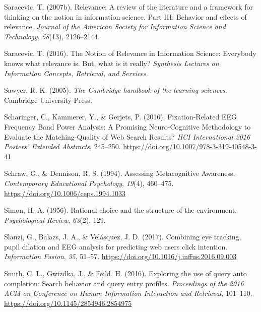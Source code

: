 \documentclass[letterpaper, nobind]{templates/ociamthesis}
\newlength{\cslhangindent}
\newenvironment{CSLReferences}[2] %
 {%
  \setlength{\parindent}{0pt}
  \ifodd #1
  \let\oldpar\par
  \def\par{\hangindent=\cslhangindent\oldpar}
  \fi
  \setlength{\parskip}{1mm}
  \setlength{\baselineskip}{6mm}
 }%
 {}
\begin{document}
\begin{CSLReferences}{1}{0}
\leavevmode{}%
Saracevic, T. (2007b). Relevance: A review of the literature and a framework for thinking on the notion in information science. {Part III}: Behavior and effects of relevance. \emph{Journal of the American Society for Information Science and Technology}, \emph{58}(13), 2126--2144.

\leavevmode{}%
Saracevic, T. (2016). The {Notion} of {Relevance} in {Information Science}: {Everybody} knows what relevance is. {But}, what is it really? \emph{Synthesis Lectures on Information Concepts, Retrieval, and Services}.

\leavevmode{}%
Sawyer, R. K. (2005). \emph{The {Cambridge} handbook of the learning sciences}. {Cambridge University Press}.

\leavevmode{}%
Scharinger, C., Kammerer, Y., \& Gerjets, P. (2016). Fixation-{Related EEG Frequency Band Power Analysis}: {A Promising Neuro}-{Cognitive Methodology} to {Evaluate} the {Matching}-{Quality} of {Web Search Results}? \emph{{HCI International} 2016 \textendash{} {Posters}' {Extended Abstracts}}, 245--250. \url{https://doi.org/10.1007/978-3-319-40548-3-41}

\leavevmode{}%
Schraw, G., \& Dennison, R. S. (1994). Assessing {Metacognitive Awareness}. \emph{Contemporary Educational Psychology}, \emph{19}(4), 460--475. \url{https://doi.org/10.1006/ceps.1994.1033}

\leavevmode{}%
Simon, H. A. (1956). Rational choice and the structure of the environment. \emph{Psychological Review}, \emph{63}(2), 129.

\leavevmode{}%
Slanzi, G., Balazs, J. A., \& Velásquez, J. D. (2017). Combining eye tracking, pupil dilation and {EEG} analysis for predicting web users click intention. \emph{Information Fusion}, \emph{35}, 51--57. \url{https://doi.org/10.1016/j.inffus.2016.09.003}

\leavevmode{}%
Smith, C. L., Gwizdka, J., \& Feild, H. (2016). Exploring the use of query auto completion: {Search} behavior and query entry profiles. \emph{Proceedings of the 2016 {ACM} on Conference on Human Information Interaction and Retrieval}, 101--110. \url{https://doi.org/10.1145/2854946.2854975}


\end{CSLReferences}
\end{document}
